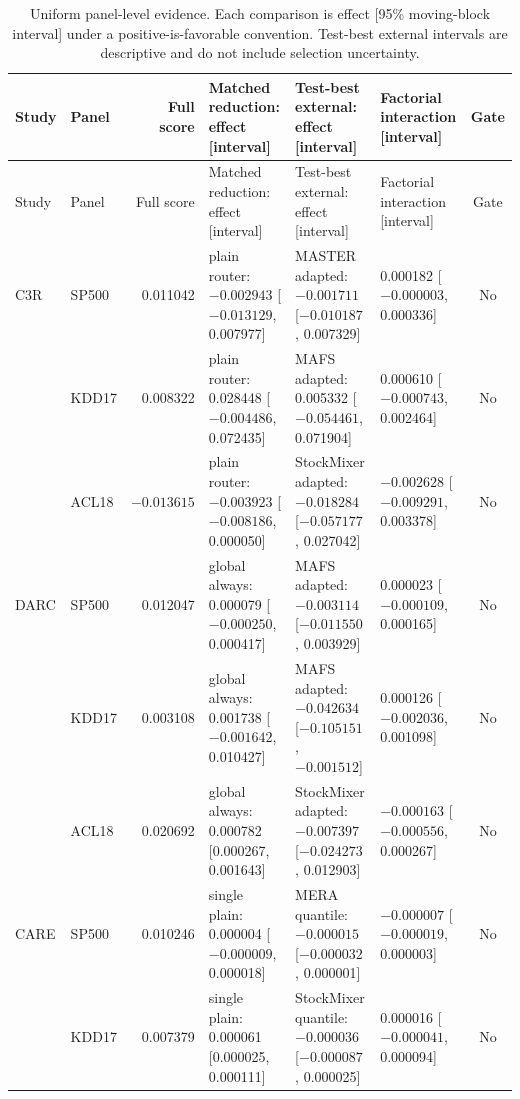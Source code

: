 \documentclass{crebss}
\begin{document}
\begingroup
\setlength{\tabcolsep}{1.5pt}
\renewcommand{\arraystretch}{1.10}
\scriptsize
\begin{longtable}{L{1.15cm}L{1.10cm}rL{3.25cm}L{3.35cm}L{3.05cm}c}
\caption{Uniform panel-level evidence. Each comparison is effect [95\% moving-block interval] under a positive-is-favorable convention. Test-best external intervals are descriptive and do not include selection uncertainty.}\label{tab:main}\\
\toprule
Study & Panel & Full score & Matched reduction: effect [interval] & Test-best external: effect [interval] & Factorial interaction [interval] & Gate \\
\midrule
\endfirsthead
\toprule
Study & Panel & Full score & Matched reduction: effect [interval] & Test-best external: effect [interval] & Factorial interaction [interval] & Gate \\
\midrule
\endhead
C3R & SP500 & 0.011042 & plain router: $-0.002943$ [$-0.013129$, 0.007977] & MASTER adapted: $-0.001711$ [$-0.010187$, 0.007329] & 0.000182 [$-0.000003$, 0.000336] & No \\
 & KDD17 & 0.008322 & plain router: 0.028448 [$-0.004486$, 0.072435] & MAFS adapted: 0.005332 [$-0.054461$, 0.071904] & 0.000610 [$-0.000743$, 0.002464] & No \\
 & ACL18 & $-0.013615$ & plain router: $-0.003923$ [$-0.008186$, 0.000050] & StockMixer adapted: $-0.018284$ [$-0.057177$, 0.027042] & $-0.002628$ [$-0.009291$, 0.003378] & No \\
\addlinespace
DARC & SP500 & 0.012047 & global always: 0.000079 [$-0.000250$, 0.000417] & MAFS adapted: $-0.003114$ [$-0.011550$, 0.003929] & 0.000023 [$-0.000109$, 0.000165] & No \\
 & KDD17 & 0.003108 & global always: 0.001738 [$-0.001642$, 0.010427] & MAFS adapted: $-0.042634$ [$-0.105151$, $-0.001512$] & 0.000126 [$-0.002036$, 0.001098] & No \\
 & ACL18 & 0.020692 & global always: 0.000782 [0.000267, 0.001643] & StockMixer adapted: $-0.007397$ [$-0.024273$, 0.012903] & $-0.000163$ [$-0.000556$, 0.000267] & No \\
\addlinespace
CARE & SP500 & 0.010246 & single plain: 0.000004 [$-0.000009$, 0.000018] & MERA quantile: $-0.000015$ [$-0.000032$, 0.000001] & $-0.000007$ [$-0.000019$, 0.000003] & No \\
 & KDD17 & 0.007379 & single plain: 0.000061 [0.000025, 0.000111] & StockMixer quantile: $-0.000036$ [$-0.000087$, 0.000025] & 0.000016 [$-0.000041$, 0.000094] & No \\

\end{longtable}
\end{document}
